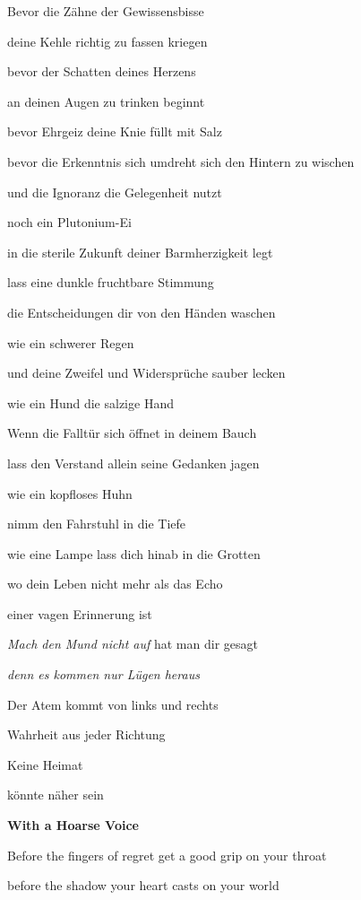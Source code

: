 \documentclass[a4paper]{article}
\begin{document}
Bevor die Zähne der Gewissensbisse

deine Kehle richtig zu fassen kriegen

bevor der Schatten deines Herzens

an deinen Augen zu trinken beginnt

bevor Ehrgeiz deine Knie füllt mit Salz

bevor die Erkenntnis sich umdreht sich den Hintern zu wischen

und die Ignoranz die Gelegenheit nutzt

noch ein Plutonium-Ei

in die sterile Zukunft deiner Barmherzigkeit legt


\bigskip

lass eine dunkle fruchtbare Stimmung

die Entscheidungen dir von den Händen waschen

wie ein schwerer Regen

und deine Zweifel und Widersprüche sauber lecken

wie ein Hund die salzige Hand


\bigskip

Wenn die Falltür sich öffnet in deinem Bauch

lass den Verstand allein seine Gedanken jagen

wie ein kopfloses Huhn

nimm den Fahrstuhl in die Tiefe

wie eine Lampe lass dich hinab in die Grotten

wo dein Leben nicht mehr als das Echo 

einer vagen Erinnerung ist


\bigskip

\textit{Mach den Mund nicht auf }hat man dir gesagt

{\itshape
denn es kommen nur Lügen heraus }


\bigskip

Der Atem kommt von links und rechts

Wahrheit aus jeder Richtung

Keine Heimat 

könnte näher sein

{\bfseries
With a Hoarse Voice}


\bigskip

Before the fingers of regret get a good grip on your throat

before the shadow your heart casts on your world
\end{document}
